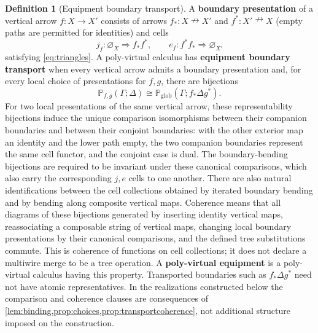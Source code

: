 \documentclass[11pt,reqno]{amsart}
\theoremstyle{plain}
\theoremstyle{definition}
\newtheorem{definition}[theorem]{Definition}
\theoremstyle{remark}
\numberwithin{equation}{section}
\newcommand{\Pcal}{\mathbb P}
\newcommand{\harr}{\mathrel{\nrightarrow}}
\newcommand{\cell}{\mathrel{\Longrightarrow}}
\newcommand{\emp}[1]{\varnothing_{#1}}
\begin{document}
\begin{definition}[Equipment boundary transport]\label{def:equipment}
A \textbf{boundary presentation} of a vertical arrow $f:X\to X'$ consists
of arrows $f_*:X\harr X'$ and $f^*:X'\harr X$ (empty paths are permitted
for identities) and cells
\[
 j_f:\emp X\cell f_*f^*,\qquad
 e_f:f^*f_*\cell\emp{X'}
\]
satisfying \cref{eq:triangles}. A poly-virtual calculus has
\textbf{equipment boundary transport} when every vertical arrow admits a
boundary presentation and, for every local choice of presentations for
$f,g$, there are bijections
\[
 \Pcal_{f,g}(\Gamma;\Delta)
   \cong\Pcal_{\mathrm{glob}}(\Gamma;f_*\Delta g^*).
\]
For two local presentations of the same vertical arrow, these
representability bijections induce the unique comparison isomorphisms
between their companion boundaries and between their conjoint boundaries:
with the other exterior map an identity and the lower path empty, the two
companion boundaries represent the same cell functor, and the conjoint
case is dual. The boundary-bending bijections are required to be invariant
under these canonical comparisons, which also carry the corresponding
$j,e$ cells to one another. There are also natural identifications between the cell
collections obtained by iterated boundary bending and by bending along
composite vertical maps. Coherence means that all diagrams of these
bijections generated by inserting identity vertical maps, reassociating a
composable string of vertical maps, changing local boundary presentations
by their canonical comparisons, and the defined tree substitutions
commute. This is coherence of functions on cell collections; it does not
declare a multiwire merge to be a tree operation. A \textbf{poly-virtual
equipment} is a poly-virtual calculus having this property. Transported
boundaries such as $f_*\Delta g^*$ need not have atomic representatives.
In the realizations constructed below the comparison and coherence clauses
are consequences of \cref{lem:binding,prop:choices,prop:transportcoherence},
not additional structure imposed on the construction.
\end{definition}
\end{document}
